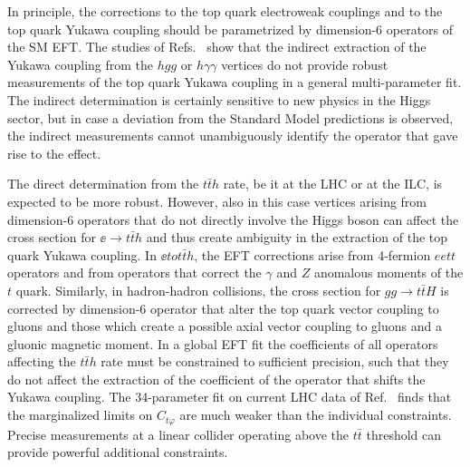 In principle, the corrections to the top quark electroweak couplings
and to the top quark Yukawa coupling should be parametrized by
dimension-6 operators of the SM EFT. The studies of Refs.~\cite{Azatov:2016xik,Durieux:2018ggn} 
show that the indirect extraction of the Yukawa coupling from the $hgg$ or
$ h \gamma \gamma$ vertices do not provide robust measurements of the
top quark Yukawa coupling in a general multi-parameter fit. The indirect determination is certainly 
sensitive to new physics in the Higgs sector, but in case a deviation from the Standard Model predictions 
is observed, the indirect measurements cannot unambiguously identify the operator that gave rise to 
the effect.  

The direct determination from the $t\bar{t}h$ rate, be it at the LHC
or at the ILC, is expected to be more robust. However, also in this case
vertices arising from dimension-6 operators
that do not directly involve the Higgs boson can affect the cross
section for $\ee\to t\bar t h$ and thus create ambiguity in the
extraction of the top quark Yukawa coupling. In $\ee to t\bar t h$,
the EFT corrections arise from 4-fermion $eett$ operators and from
operators that correct the $\gamma$ and $Z$ anomalous moments of the
$t$ quark. Similarly, in hadron-hadron collisions, the cross section
for $gg\to t\bar t H$ is corrected by dimension-6 operator that alter
the top quark vector coupling to gluons and those which create a
possible axial vector coupling to gluons and a gluonic magnetic
moment. In a global EFT fit the coefficients of all operators affecting 
the $t\bar{t}h$ rate must be constrained to sufficient precision, such that 
they do not affect the extraction of the coefficient of the operator that 
shifts the Yukawa coupling. The 34-parameter fit on current LHC data of 
Ref.~\cite{Hartland:2019bjb} finds that the marginalized limits on $C_{t \varphi}$
are much weaker than the individual constraints. Precise measurements at
a linear collider operating above the $t\bar{t}$ threshold can provide powerful
additional constraints.